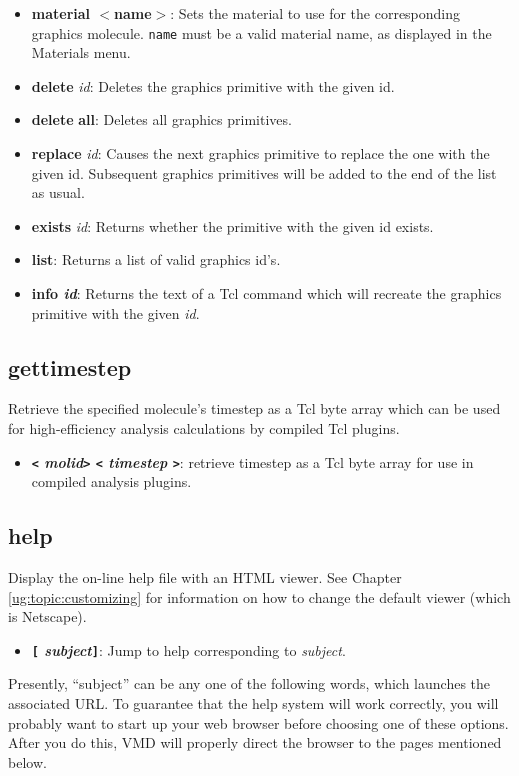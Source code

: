 \begin{itemize}
\item {\bf material $<$name$>$}:
  Sets the material to use for the corresponding graphics molecule.
{\tt name} must be a valid material name, as displayed in the Materials menu.

\item {\bf delete} {\it id}:
Deletes the graphics primitive with the given id.
\item {\bf delete} {\bf all}:
Deletes all graphics primitives.
\item {\bf replace} {\it id}:
Causes the next graphics primitive to replace the one with the given id.
Subsequent graphics primitives will be added to the end of the list as
usual.
\item{\bf exists} {\it id}:
Returns whether the primitive with the given id exists.
\item{\bf list}:
Returns a list of valid graphics id's.
\item{\bf info {\it id}}:
Returns the text of a Tcl command which will recreate the graphics primitive
with the given {\it id}.

\end{itemize}

\subsection{gettimestep}
Retrieve the specified molecule's timestep as a Tcl byte array which can
be used for high-efficiency analysis calculations by compiled Tcl plugins.
  \begin{itemize}
    \item {\bf  {\tt <} {\it molid}{\tt >} {\tt <} {\it timestep} {\tt >}}: retrieve timestep as a Tcl byte array for use in compiled analysis plugins.
  \end{itemize}


\subsection{help}
Display the on-line help file with an HTML viewer.  See 
Chapter \ref{ug:topic:customizing}
for information on how to change the default viewer (which is Netscape).

  \begin{itemize}
    \item {\bf  {\tt [} {\it subject}{\tt ]}}: Jump to help corresponding 
    to {\it subject}.
  \end{itemize}
Presently, ``subject'' can be any one of the following words, which
launches the associated URL.  To guarantee that the help system will
work correctly, you will probably want to start up your web browser
before choosing one of these options.  After you do this, VMD will
properly direct the browser to the pages mentioned below.


